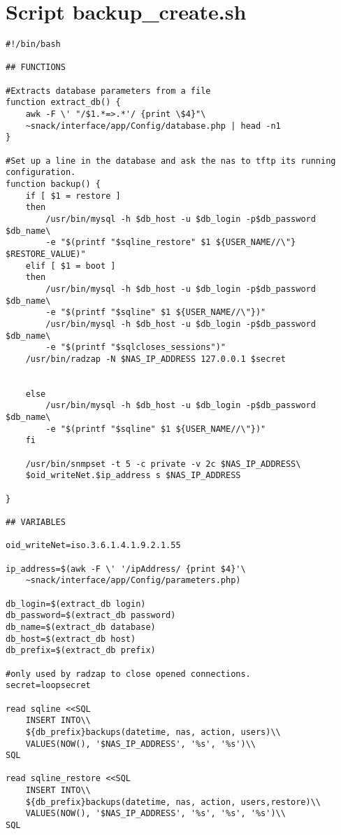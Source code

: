 \newpage
\appendix
\section{Script backup\_create.sh}

\begin{lstlisting}
#!/bin/bash

## FUNCTIONS

#Extracts database parameters from a file
function extract_db() {
    awk -F \' "/$1.*=>.*'/ {print \$4}"\
	~snack/interface/app/Config/database.php | head -n1
}

#Set up a line in the database and ask the nas to tftp its running configuration.
function backup() {
    if [ $1 = restore ]
    then
    	/usr/bin/mysql -h $db_host -u $db_login -p$db_password $db_name\
		-e "$(printf "$sqline_restore" $1 ${USER_NAME//\"} $RESTORE_VALUE)"
    elif [ $1 = boot ]
    then
    	/usr/bin/mysql -h $db_host -u $db_login -p$db_password $db_name\
		-e "$(printf "$sqline" $1 ${USER_NAME//\"})"
    	/usr/bin/mysql -h $db_host -u $db_login -p$db_password $db_name\
		-e "$(printf "$sqlcloses_sessions")"
	/usr/bin/radzap -N $NAS_IP_ADDRESS 127.0.0.1 $secret
		

    else
    	/usr/bin/mysql -h $db_host -u $db_login -p$db_password $db_name\
		-e "$(printf "$sqline" $1 ${USER_NAME//\"})"
    fi

    /usr/bin/snmpset -t 5 -c private -v 2c $NAS_IP_ADDRESS\
	$oid_writeNet.$ip_address s $NAS_IP_ADDRESS

}

## VARIABLES

oid_writeNet=iso.3.6.1.4.1.9.2.1.55

ip_address=$(awk -F \' '/ipAddress/ {print $4}'\
    ~snack/interface/app/Config/parameters.php)

db_login=$(extract_db login)
db_password=$(extract_db password)
db_name=$(extract_db database)
db_host=$(extract_db host)
db_prefix=$(extract_db prefix)

#only used by radzap to close opened connections.
secret=loopsecret

read sqline <<SQL
    INSERT INTO\\
    ${db_prefix}backups(datetime, nas, action, users)\\
    VALUES(NOW(), '$NAS_IP_ADDRESS', '%s', '%s')\\
SQL

read sqline_restore <<SQL
    INSERT INTO\\
    ${db_prefix}backups(datetime, nas, action, users,restore)\\
    VALUES(NOW(), '$NAS_IP_ADDRESS', '%s', '%s', '%s')\\
SQL


\end{lstlisting}
